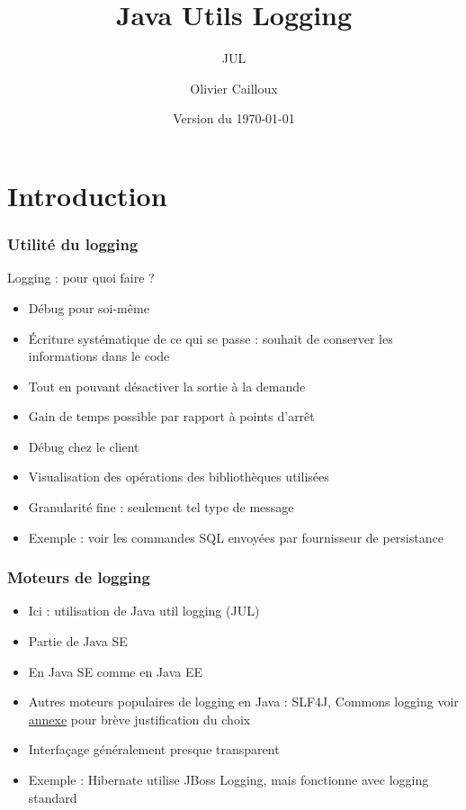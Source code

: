 \documentclass[english, french]{beamer}
\title{Java Utils Logging}
\subtitle{JUL}
\author{Olivier Cailloux}
\institute[LAMSADE]{LAMSADE, Université Paris-Dauphine}
\date{Version du \today}
\begin{document}


\begin{frame}[plain]
   \titlepage
\end{frame}
\addtocounter{framenumber}{-1}

\section{Introduction}
\begin{frame}
	\frametitle{Utilité du logging}
	Logging : pour quoi faire ? \pause
	\begin{itemize}
		\item Débug pour soi-même
		\item Écriture systématique de ce qui se passe : souhait de conserver les informations dans le code
		\item Tout en pouvant désactiver la sortie à la demande
		\item Gain de temps possible par rapport à points d’arrêt
		\item Débug chez le client
		\item Visualisation des opérations des bibliothèques utilisées
		\item Granularité fine : seulement tel type de message
		\item Exemple : voir les commandes SQL envoyées par fournisseur de persistance
	\end{itemize}
\end{frame}

\begin{frame}
	\frametitle{Moteurs de logging}
	\begin{itemize}
		\item Ici : utilisation de Java util logging (JUL)
		\item Partie de Java SE
		\item En Java SE comme en Java EE
		\item Autres moteurs populaires de logging en Java : SLF4J, Commons logging {\tiny voir \hyperlink{Bataille}{annexe} pour brève justification du choix}
		\item Interfaçage {\tiny généralement presque} transparent
		\item Exemple : Hibernate utilise JBoss Logging, mais fonctionne avec logging standard
	\end{itemize}
\end{frame}
\end{document}
